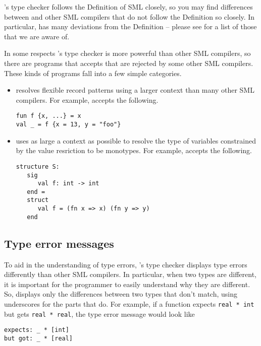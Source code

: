 %
{\mlton}'s type checker follows the Definition of SML closely, so you
may find differences between {\mlton} and other SML compilers that do
not follow the Definition so closely.  In particular, {\smlnj} has
many deviations from the Definition -- please see
 for a list of those that we are aware of.

In some respects {\mlton}'s type checker is more powerful than other
SML compilers, so there are programs that {\mlton} accepts that are
rejected by some other SML compilers.  These kinds of programs fall
into a few simple categories.

\begin{itemize}

\item
{\mlton} resolves flexible record patterns using a larger context than
many other SML compilers.  For example, {\mlton} accepts the
following.
\begin{verbatim}
fun f {x, ...} = x
val _ = f {x = 13, y = "foo"}
\end{verbatim}
%
\item
{\mlton} uses as large a context as possible to resolve the type of
variables constrained by the value resriction to be monotypes.  For
example, {\mlton} accepts the following.
\begin{verbatim}
structure S:
   sig
      val f: int -> int
   end =
   struct
      val f = (fn x => x) (fn y => y)
   end
\end{verbatim}

\end{itemize}

\subsection{Type error messages}

To aid in the understanding of type errors, {\mlton}'s type checker
displays type errors differently than other SML compilers.  In
particular, when two types are different, it is important for the
programmer to easily understand why they are different.  So, {\mlton}
displays only the differences between two types that don't match,
using underscores for the parts that do.  For example, if a
function expects {\tt real * int} but gets {\tt real * real}, the type
error message would look like
\begin{verbatim}
expects: _ * [int]
but got: _ * [real]
\end{verbatim}

